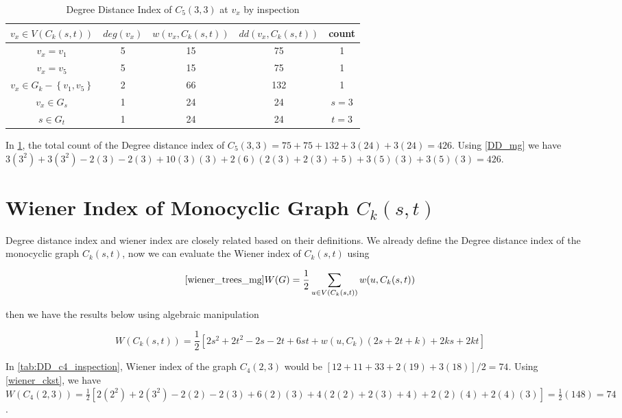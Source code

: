 \begin{e.g.}
\begin{table}[!ht]
\caption{Degree Distance Index of $C_5(3,3)$ at $v_x$ by inspection}
\begin{center}
\begin{tabular}{|c|c|c|c|c|}
\hline 
$v_x\in V(C_k(s,t))$ & $deg(v_x)$ & $w(v_x,C_k(s,t))$ & $dd(v_x,C_k(s,t))$ & count \\ 
\hline 
$v_x=v_1$ & 5 & 15 & 75 & 1 \\ 
\hline 
$v_x=v_5$ & 5 & 15 & 75 & 1 \\ 
\hline 
$v_x\in G_k-\left\lbrace v_1,v_5 \right\rbrace$ & 2 & 66 & 132 & 1 \\ 
\hline 
$v_x\in G_s$ & 1 & 24 & 24 & $s=3$ \\ 
\hline 
$s\in G_t$ & 1 & 24 & 24 & $t=3$ \\ 
\hline 
\end{tabular} 
\end{center}
\label{tab:DD_c5_mg}
\end{table}

\begin{e.g.}\rm
In \ref{tab:DD_c5_mg}, the total count of the Degree distance index of $C_5(3,3)=75+75+132+3(24)+3(24)=426$. Using \ref{DD_mg} we have $3(3^2)+3(3^2)-2(3)-2(3)+10(3)(3)+2(6)(2(3)+2(3)+5)+3(5)(3)+3(5)(3)=426$.
\end{e.g.}

\section{Wiener Index of Monocyclic Graph $C_k(s,t)$}
Degree distance index and wiener index are closely related based on their definitions. We already define the Degree distance index of the monocyclic graph $C_k(s,t)$, now we can evaluate the Wiener index of $C_k(s,t)$ using 

\begin{equation}
\cite{wiener_trees_mg} W(G)=\frac{1}{2}\sum_{u\in V(C_k(s,t))}w(u,C_k(s,t))
\label{sum_wiener_u}
\end{equation}

then we have the results below using algebraic manipulation

\begin{equation}
W(C_k(s,t))=\frac{1}{2}[2s^2+2t^2-2s-2t+6st+w(u,C_k)(2s+2t+k)+2ks+2kt]
\label{wiener_ckst}
\end{equation}

\begin{e.g.}\rm
In \ref{tab:DD_c4_inspection}, Wiener index of the graph $C_4(2,3)$ would be $[12+11+33+2(19)+3(18)]/2=74$. Using \ref{wiener_ckst}, we have $W(C_4(2,3))=\frac{1}{2}[2(2^2)+2(3^2)-2(2)-2(3)+6(2)(3)+4(2(2)+2(3)+4)+2(2)(4)+2(4)(3)]=\frac{1}{2}(148)=74$.
\end{e.g.}


\end{e.g.}
